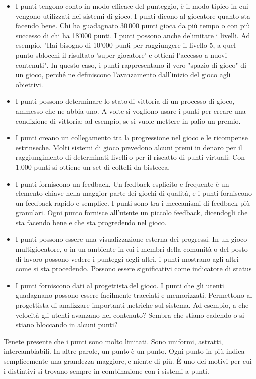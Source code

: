 \begin{itemize}
\item I punti tengono conto in modo efficace del punteggio, è il modo tipico in cui vengono utilizzati nei sistemi di gioco. I punti dicono al giocatore quanto sta facendo bene. Chi ha guadagnato 30'000 punti gioca da più tempo o con più successo di chi ha 18'000 punti. I punti possono anche delimitare i livelli. Ad esempio, "Hai bisogno di 10'000 punti per raggiungere il livello 5, a quel punto sblocchi il risultato 'super giocatore' e ottieni l'accesso a nuovi contenuti". In questo caso, i punti rappresentano il vero "spazio di gioco" di un gioco, perché ne definiscono l'avanzamento dall'inizio del gioco agli obiettivi.
\item I punti possono determinare lo stato di vittoria di un processo di gioco, ammesso che ne abbia uno. A volte si vogliono usare i punti per creare una condizione di vittoria: ad esempio, se si vuole mettere in palio un premio.
\item I punti creano un collegamento tra la progressione nel gioco e le ricompense estrinseche. Molti sistemi di gioco prevedono alcuni premi in denaro per il raggiungimento di determinati livelli o per il riscatto di punti virtuali: Con 1.000 punti si ottiene un set di coltelli da bistecca.
\item I punti forniscono un feedback. Un feedback esplicito e frequente è un elemento chiave nella maggior parte dei giochi di qualità, e i punti forniscono un feedback rapido e semplice. I punti sono tra i meccanismi di feedback più granulari. Ogni punto fornisce all'utente un piccolo feedback, dicendogli che sta facendo bene e che sta progredendo nel gioco.
\item I punti possono essere una visualizzazione esterna dei progressi. In un gioco multigiocatore, o in un ambiente in cui i membri della comunità o del posto di lavoro possono vedere i punteggi degli altri, i punti mostrano agli altri come si sta procedendo. Possono essere significativi come indicatore di status
\item I punti forniscono dati al progettista del gioco. I punti che gli utenti guadagnano possono essere facilmente tracciati e memorizzati. Permettono al progettista di analizzare importanti metriche sul sistema. Ad esempio, a che velocità gli utenti avanzano nel contenuto?
Sembra che stiano cadendo o si stiano bloccando in alcuni punti?
\end{itemize}
Tenete presente che i punti sono molto limitati. Sono uniformi, astratti, intercambiabili. In altre parole, un punto è un punto. Ogni punto in più indica semplicemente una grandezza maggiore, e niente di più. È uno dei motivi per cui i distintivi si trovano sempre in combinazione con i sistemi a punti.\\
